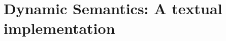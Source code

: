 \newpage
\texHeader

\section{Dynamic Semantics: A textual implementation}
\hypertarget{texSDM start}{}

















